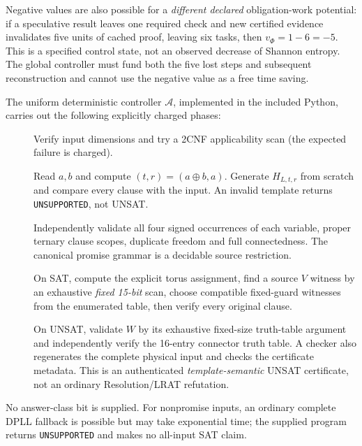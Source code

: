\documentclass[11pt]{article}
\begin{document}
Negative values are also possible for a \emph{different declared} obligation-work potential: if a speculative result leaves one required check and new certified evidence invalidates five units of cached proof, leaving six tasks, then $v_\Phi=1-6=-5$. This is a specified control state, not an observed decrease of Shannon entropy. The global controller must fund both the five lost steps and subsequent reconstruction and cannot use the negative value as a free time saving.

The uniform deterministic controller $\mathcal A$, implemented in the included Python, carries out the following explicitly charged phases:
\begin{description}
\item[] Verify input dimensions and try a 2CNF applicability scan (the expected failure is charged).
\item[] Read $a,b$ and compute $(t,r)=(a\oplus b,a)$. Generate $H_{L,t,r}$ from scratch and compare every clause with the input. An invalid template returns \texttt{UNSUPPORTED}, not UNSAT.
\item[] Independently validate all four signed occurrences of each variable, proper ternary clause scopes, duplicate freedom and full connectedness. The canonical promise grammar is a decidable source restriction.
\item[] On SAT, compute the explicit torus assignment, find a source $V$ witness by an exhaustive \emph{fixed 15-bit} scan, choose compatible fixed-guard witnesses from the enumerated table, then verify every original clause.
\item[] On UNSAT, validate $W$ by its exhaustive fixed-size truth-table argument and independently verify the 16-entry connector truth table. A checker also regenerates the complete physical input and checks the certificate metadata. This is an authenticated \emph{template-semantic} UNSAT certificate, not an ordinary Resolution/LRAT refutation.
\end{description}
No answer-class bit is supplied. For nonpromise inputs, an ordinary complete DPLL fallback is possible but may take exponential time; the supplied program returns \texttt{UNSUPPORTED} and makes no all-input SAT claim.
\end{document}
